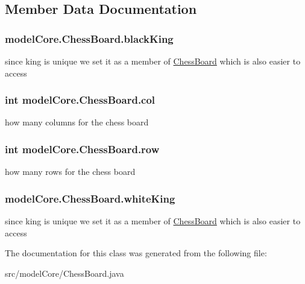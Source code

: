 \subsection{Member Data Documentation}
\hypertarget{classmodel_core_1_1_chess_board_a4a811ce68180a71f5fea55095c3ef0f5}{
\subsubsection[{black\+King}]{ model\+Core.\+Chess\+Board.\+black\+King}}\label{classmodel_core_1_1_chess_board_a4a811ce68180a71f5fea55095c3ef0f5}
since king is unique we set it as a member of \hyperlink{classmodel_core_1_1_chess_board}{Chess\+Board} which is also easier to access \hypertarget{classmodel_core_1_1_chess_board_ad7110bd9ee10396094cb5a58406bd04e}{
\subsubsection[{col}]{\setlength{\rightskip}{0pt plus 5cm}int model\+Core.\+Chess\+Board.\+col}}\label{classmodel_core_1_1_chess_board_ad7110bd9ee10396094cb5a58406bd04e}
how many columns for the chess board \hypertarget{classmodel_core_1_1_chess_board_a97b8b44a011e141557812f801be59fb3}{
\subsubsection[{row}]{\setlength{\rightskip}{0pt plus 5cm}int model\+Core.\+Chess\+Board.\+row}}\label{classmodel_core_1_1_chess_board_a97b8b44a011e141557812f801be59fb3}
how many rows for the chess board \hypertarget{classmodel_core_1_1_chess_board_ac35268604f4e0b6c5b0b1a454f71f6b6}{
\subsubsection[{white\+King}]{ model\+Core.\+Chess\+Board.\+white\+King}}\label{classmodel_core_1_1_chess_board_ac35268604f4e0b6c5b0b1a454f71f6b6}
since king is unique we set it as a member of \hyperlink{classmodel_core_1_1_chess_board}{Chess\+Board} which is also easier to access 

The documentation for this class was generated from the following file\+:\begin{DoxyCompactItemize}
\item 
src/model\+Core/Chess\+Board.\+java\end{DoxyCompactItemize}
